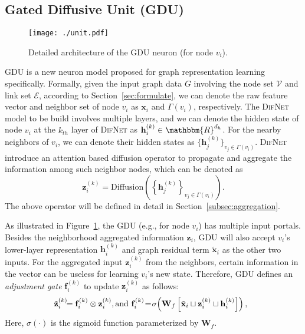 \documentclass{article}
\newcommand{\mb}{\mathbf}
\newcommand{\mc}{\mathcal}
\newcommand{\our}{\textsc{DifNet}}
\newcommand{\gdu}{\textsc{GDU}}
\begin{document}
\subsection{Gated Diffusive Unit (\gdu)}

\begin{figure}
    \centering
    \begin{minipage}{.4\textwidth}
    	\texttt{[image: ./unit.pdf]}
     \end{minipage}\caption{Detailed architecture of the {\gdu} neuron (for node $v_i$).}
    	\label{fig:unit}
\end{figure}


{\gdu} is a new neuron model proposed for graph representation learning specifically. Formally, given the input graph data $G$ involving the node set $\mc{V}$ and link set $\mc{E}$, according to Section~\ref{sec:formulate}, we can denote the raw feature vector and neighbor set of node $v_i$ as $\mb{x}_i$ and $\Gamma(v_i)$, respectively. The {\our} model to be build involves multiple layers, and we can denote the hidden state of node $v_i$ at the $k_{th}$ layer of {\our} as $\mb{h}_i^{(k)} \in \mathbbm{R}^{d_h}$. For the nearby neighbors of $v_i$, we can denote their hidden states as $\{\mb{h}^{(k)}_j \}_{v_j \in \Gamma(v_i)}$. {\our} introduce an attention based diffusion operator to propagate and aggregate the information among such neighbor nodes, which can be denoted as
\begin{equation}\label{equ:aggregate}
\mb{z}_i^{(k)} = \mbox{Diffusion} \left(\left\{ \mb{h}_j^{(k)} \right\}_{v_j \in \Gamma(v_i)} \right).
\end{equation}
The above operator will be defined in detail in Section~\ref{subsec:aggregation}.

As illustrated in Figure~\ref{fig:unit}, the {\gdu} (e.g., for node $v_i$) has multiple input portals. Besides the neighborhood aggregated information $\mb{z}_i$, {\gdu} will also accept $v_i$'s lower-layer representation $\mb{h}_i^{(k)}$ and graph residual term $\tilde{\mb{x}}_i$ as the other two inputs. For the aggregated input $\mb{z}_i^{(k)}$ from the neighbors, certain information in the vector can be useless for learning $v_i$'s new state. Therefore, {\gdu} defines an \textit{adjustment gate} $\mb{f}_i^{(k)}$ to update $\mb{z}_i^{(k)}$ as follows:
\begin{equation}
\hspace{-6pt} \tilde{\mb{z}}_{i}^{(k)} \hspace{-4pt}= \mb{f}_i^{(k)} \otimes \mb{z}_i^{(k)}, \mbox{and  }\mb{f}_i^{(k)} \hspace{-2pt} = \hspace{-2pt} \sigma \hspace{-2pt} \left( \mb{W}_f \left[\tilde{\mb{x}}_i \sqcup \mb{z}_i^{(k)} \sqcup \mb{h}_i^{(k)} \right] \right),
\end{equation}
Here, $\sigma(\cdot)$ is the sigmoid function parameterized by $\mb{W}_f$. 
\end{document}
